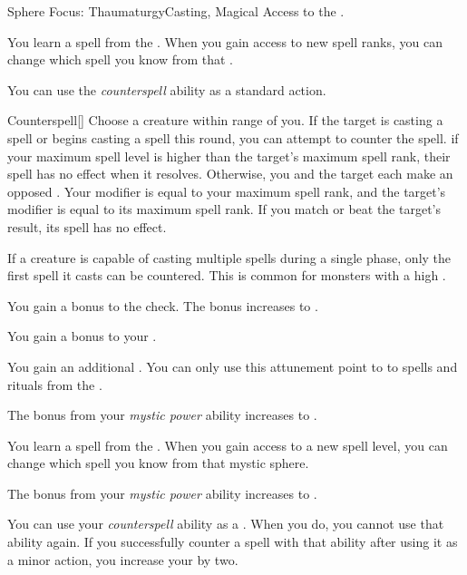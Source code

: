     \begin{feat}{Sphere Focus: Thaumaturgy}{Casting, Magical}
        \featpre Access to the  .

         You learn a spell from the  .
        When you gain access to new spell ranks, you can change which spell you know from that .

         You can use the \textit{counterspell} ability as a standard action.
        \begin{freeability}{Counterspell}[]
            Choose a creature within \rngmed range of you.
            If the target is casting a spell or begins casting a spell this round, you can attempt to counter the spell.
            if your maximum spell level is higher than the target's maximum spell rank, their spell has no effect when it resolves.
            Otherwise, you and the target each make an opposed .
            Your modifier is equal to your maximum spell rank, and the target's modifier is equal to its maximum spell rank.
            If you match or beat the target's result, its spell has no effect.

            If a creature is capable of casting multiple spells during a single phase, only the first spell it casts can be countered.
            This is common for monsters with a high .

            \rankline
             You gain a  bonus to the check.
             The bonus increases to .
        \end{freeability}

         You gain a  bonus to your .

         You gain an additional .
        You can only use this attunement point to  to spells and rituals from the  .

         The bonus from your \textit{mystic power} ability increases to .

         You learn a spell from the  .
        When you gain access to a new spell level, you can change which spell you know from that mystic sphere.

         The bonus from your \textit{mystic power} ability increases to .

         You can use your \textit{counterspell} ability as a .
        When you do, you  cannot use that ability again.
        If you successfully counter a spell with that ability after using it as a minor action, you increase your  by two.
    \end{feat}

